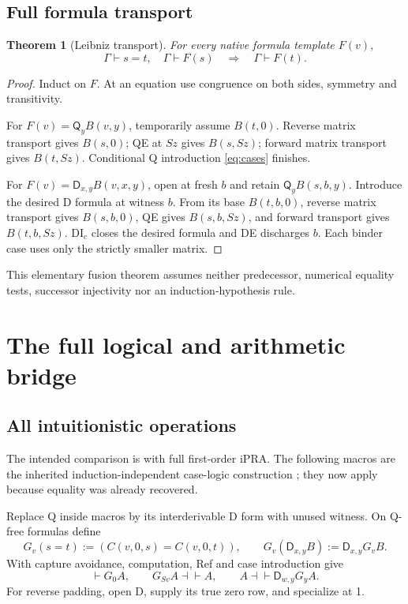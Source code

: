 \documentclass[11pt]{article}
\newtheorem{theorem}{Theorem}[section]
\newcommand{\Q}{\mathsf Q}\newcommand{\D}{\mathsf D}
\begin{document}
\subsection{Full formula transport}
\begin{theorem}[Leibniz transport]
For every native formula template $F(v)$,
\[
 \Gamma\vdash s=t,\quad\Gamma\vdash F(s)
       \quad\Longrightarrow\quad\Gamma\vdash F(t).
\]
\end{theorem}
\begin{proof}
Induct on $F$. At an equation use congruence on both sides, symmetry and
transitivity.

For $F(v)=\Q_yB(v,y)$, temporarily assume $B(t,0)$.
Reverse matrix transport gives $B(s,0)$; QE at $Sz$ gives $B(s,Sz)$;
forward matrix transport gives $B(t,Sz)$. Conditional Q introduction
\eqref{eq:cases} finishes.

For $F(v)=\D_{x,y}B(v,x,y)$, open at fresh $b$ and retain
$\Q_yB(s,b,y)$. Introduce the desired D formula at witness $b$.
From its base $B(t,b,0)$, reverse matrix transport gives $B(s,b,0)$,
QE gives $B(s,b,Sz)$, and forward transport gives $B(t,b,Sz)$.
DI$_c$ closes the desired formula and DE discharges $b$.
Each binder case uses only the strictly smaller matrix.
\end{proof}
This elementary fusion theorem assumes neither predecessor, numerical
equality tests, successor injectivity nor an induction-hypothesis rule.




\section{The full logical and arithmetic bridge}\label{sec:bridge}
\subsection{All intuitionistic operations}\label{sec:choice-introduction}
The intended comparison is with full first-order iPRA. The following
macros are the inherited induction-independent case-logic construction
\cite{choice}; they now apply because equality was already recovered.

Replace Q inside macros by its interderivable D form with unused witness.
On Q-free formulas define
\[
 G_v(s=t):=(C(v,0,s)=C(v,0,t)),\qquad
 G_v(\D_{x,y}B):=\D_{x,y}G_vB.
\]
With capture avoidance, computation, Ref and case introduction give
\[
 \vdash G_0A,\qquad G_{Sv}A\dashv\vdash A,\qquad
 A\dashv\vdash\D_{w,y}G_yA.
\]
For reverse padding, open D, supply its true zero row, and specialize at 1.
\end{document}
